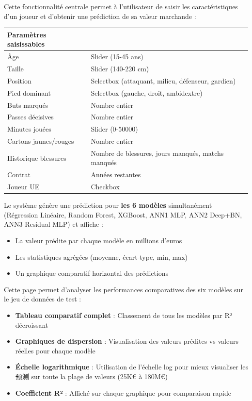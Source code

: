 \documentclass[12pt,a4paper]{article}
\begin{document}

Cette fonctionnalité centrale permet à l'utilisateur de saisir les caractéristiques d'un joueur et d'obtenir une prédiction de sa valeur marchande :

\begin{tcolorbox}[colback=accentcolor!5,colframe=accentcolor,width=\textwidth,arc=2mm,boxrule=1pt]
\small
\begin{tabular}{p{3cm} p{6.5cm}}
\textbf{Paramètres saisissables} & \\
\hline
Âge & Slider (15-45 ans) \\
Taille & Slider (140-220 cm) \\
Position & Selectbox (attaquant, milieu, défenseur, gardien) \\
Pied dominant & Selectbox (gauche, droit, ambidextre) \\
Buts marqués & Nombre entier \\
Passes décisives & Nombre entier \\
Minutes jouées & Slider (0-50000) \\
Cartons jaunes/rouges & Nombre entier \\
Historique blessures & Nombre de blessures, jours manqués, matchs manqués \\
Contrat & Années restantes \\
Joueur UE & Checkbox \\
\end{tabular}
\end{tcolorbox}

Le système génère une prédiction pour \textbf{les 6 modèles} simultanément (Régression Linéaire, Random Forest, XGBoost, ANN1 MLP, ANN2 Deep+BN, ANN3 Residual MLP) et affiche :
\begin{itemize}
    \item La valeur prédite par chaque modèle en millions d'euros
    \item Les statistiques agrégées (moyenne, écart-type, min, max)
    \item Un graphique comparatif horizontal des prédictions
\end{itemize}


Cette page permet d'analyser les performances comparatives des six modèles sur le jeu de données de test :

\begin{itemize}[leftmargin=*]
    \item \textbf{Tableau comparatif complet} : Classement de tous les modèles par R² décroissant
    \item \textbf{Graphiques de dispersion} : Visualisation des valeurs prédites vs valeurs réelles pour chaque modèle
    \item \textbf{Échelle logarithmique} : Utilisation de l'échelle log pour mieux visualiser les预测 sur toute la plage de valeurs (25K€ à 180M€)
    \item \textbf{Coefficient R²} : Affiché sur chaque graphique pour comparaison rapide
\end{itemize}
\end{document}
